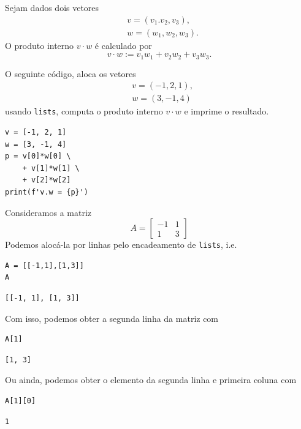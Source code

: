 \begin{ex}
  Sejam dados dois vetores
  \begin{align}
    & v = (v_1. v_2, v_3), \\
    & w = (w_1, w_2, w_3).
  \end{align}
  O produto interno $v\cdot w$ é calculado por
  \begin{equation}
    v\cdot w := v_1w_1 + v_2w_2 + v_3w_3.
  \end{equation}

  O seguinte código, aloca os vetores
  \begin{align}
    & v = (-1, 2, 1), \\
    & w = (3, -1, 4)
  \end{align}
  usando \texttt{lists}, computa o produto interno $v\cdot w$ e imprime o resultado.

\begin{lstlisting}
v = [-1, 2, 1]
w = [3, -1, 4]
p = v[0]*w[0] \
    + v[1]*w[1] \
    + v[2]*w[2]
print(f'v.w = {p}')
\end{lstlisting}

\end{ex}

\begin{ex}
  Consideramos a matriz
  \begin{equation}
    A =
    \begin{bmatrix}
      -1 & 1 \\
      1 & 3 
    \end{bmatrix}
  \end{equation}
  Podemos alocá-la por linhas pelo encadeamento de \texttt{lists}, i.e.

\begin{lstlisting}
A = [[-1,1],[1,3]]
A
\end{lstlisting}

\begin{verbatim}
[[-1, 1], [1, 3]]
\end{verbatim}

Com isso, podemos obter a segunda linha da matriz com

\begin{lstlisting}
A[1]
\end{lstlisting}

\begin{verbatim}
[1, 3]
\end{verbatim}

Ou ainda, podemos obter o elemento da segunda linha  e primeira coluna com

\begin{lstlisting}
A[1][0]
\end{lstlisting}

\begin{verbatim}
1
\end{verbatim}

\end{ex}

